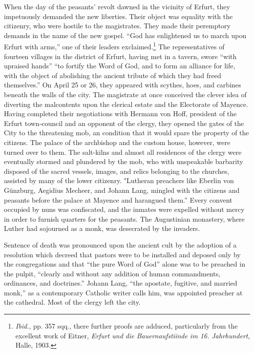 When the day of the peasants’ revolt dawned in the vicinity of
Erfurt, they impetuously demanded the new liberties. Their object
was equality with the citizenry, who were hostile to the magistrates.
They made their peremptory demands in the name of the new
gospel. “God has enlightened us to march upon Erfurt with arms,”
one of their leaders exclaimed.\footnote
{\textit{Ibid.}, pp. 357 sqq., there further proofs are adduced, particularly from the excellent
work of Eitner, \textit{Erfurt und die Bauernaufstiinde im 16. Jahrhundert}, Halle, 1903.}
The representatives of fourteen
villages in the district of Erfurt, having met in a tavern, swore
“with upraised hands” “to fortify the Word of God, and to form
an alliance for life, with the object of abolishing the ancient tribute
of which they had freed themselves.” On April 25 or 26, they appeared
with scythes, hoes, and carbines beneath the walls of the
city. The magistrate at once conceived the clever idea of diverting
the malcontents upon the clerical estate and the Electorate of Mayence.
Having completed their negotiations with Hermann von Hoff, president
of the Erfurt town-council and an opponent of the clergy, they opened
the gates of the City to the threatening mob, an condition that it would
spare the property of the citizens. The palace of the archbishop and the
custom house, however, were turned over to them. The salt-kilns and almost
all residences of the clergy were eventually stormed and plundered by
the mob, who with unspeakable barbarity disposed of the sacred vessels,
images, and relics belonging to the churches, assisted by many of the
lower citizenry. "Lutheran preachers like Eberlin von Günzburg, Aegidius
Mecheer, and Johann Lang, mingled with the citizens and peasants
before the palace at Mayence and harangued them.” Every convent
occupied by nuns was confiscated, and the inmates were expelled
without mercy in order to furnish quarters for the peasants. The
Augustinian monastery, where Luther had sojourned as a monk, was
desecrated by the invaders.

Sentence of death was pronounced upon the ancient cult by the
adoption of a resolution which decreed that pastors were to be installed
and deposed only by the congregations and that “the pure
Word of God” alone was to be preached in the pulpit, “clearly and
without any addition of human commandments, ordinances, and
doctrines.” Johann Lang, “the apostate, fugitive, and married monk,”
as a contemporary Catholic writer calls him, was appointed preacher
at the cathedral. Most of the clergy left the city.

